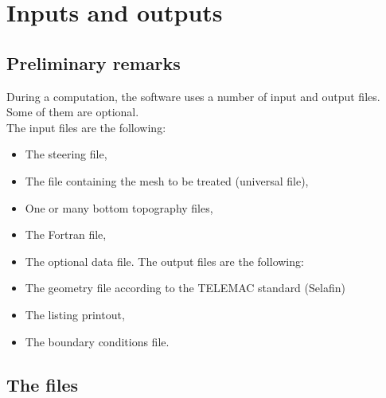 \chapter{Inputs and outputs}
\section{Preliminary remarks}
During a computation, the \stbtel software uses a number of input and output
files. Some of them are optional.\\
The input files are the following:
\begin{itemize}
\item The steering file,
\item The file containing the mesh to be treated (universal file),
\item One or many bottom topography files,
\item The Fortran file,
\item The optional data file.
The output files are the following:
\end{itemize}
\begin{itemize}
\item The geometry file according to the TELEMAC standard (Selafin)
\item The listing printout,
\item The boundary conditions file.
\end{itemize}

\section{The files}
